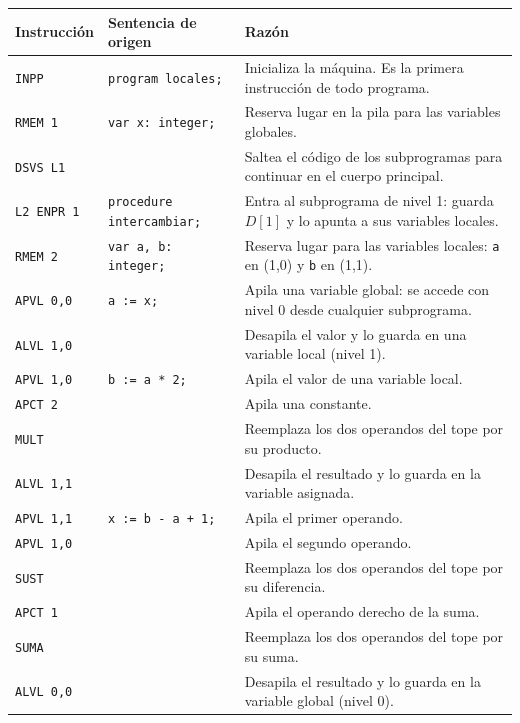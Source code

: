\documentclass[12pt]{article}
\begin{document}
\begin{longtable}{|p{3.2cm}|p{5cm}|p{7cm}|}
\hline
\textbf{Instrucción} & \textbf{Sentencia de origen} & \textbf{Razón} \\
\hline
\endhead
\texttt{INPP} & \texttt{program locales;} & Inicializa la máquina. Es la primera instrucción de todo programa. \\
\hline
\texttt{RMEM 1} & \texttt{var x: integer;} & Reserva lugar en la pila para las variables globales. \\
\hline
\texttt{DSVS L1} & \texttt{} & Saltea el código de los subprogramas para continuar en el cuerpo principal. \\
\hline
\texttt{L2 ENPR 1} & \texttt{procedure intercambiar;} & Entra al subprograma de nivel 1: guarda $D[1]$ y lo apunta a sus variables locales. \\
\hline
\texttt{RMEM 2} & \texttt{var a, b: integer;} & Reserva lugar para las variables locales: \texttt{a} en (1,0) y \texttt{b} en (1,1). \\
\hline
\texttt{APVL 0,0} & \texttt{a := x;} & Apila una variable global: se accede con nivel 0 desde cualquier subprograma. \\
\hline
\texttt{ALVL 1,0} & \texttt{} & Desapila el valor y lo guarda en una variable local (nivel 1). \\
\hline
\texttt{APVL 1,0} & \texttt{b := a * 2;} & Apila el valor de una variable local. \\
\hline
\texttt{APCT 2} & \texttt{} & Apila una constante. \\
\hline
\texttt{MULT} & \texttt{} & Reemplaza los dos operandos del tope por su producto. \\
\hline
\texttt{ALVL 1,1} & \texttt{} & Desapila el resultado y lo guarda en la variable asignada. \\
\hline
\texttt{APVL 1,1} & \texttt{x := b - a + 1;} & Apila el primer operando. \\
\hline
\texttt{APVL 1,0} & \texttt{} & Apila el segundo operando. \\
\hline
\texttt{SUST} & \texttt{} & Reemplaza los dos operandos del tope por su diferencia. \\
\hline
\texttt{APCT 1} & \texttt{} & Apila el operando derecho de la suma. \\
\hline
\texttt{SUMA} & \texttt{} & Reemplaza los dos operandos del tope por su suma. \\
\hline
\texttt{ALVL 0,0} & \texttt{} & Desapila el resultado y lo guarda en la variable global (nivel 0). \\

\end{longtable}
\end{document}
